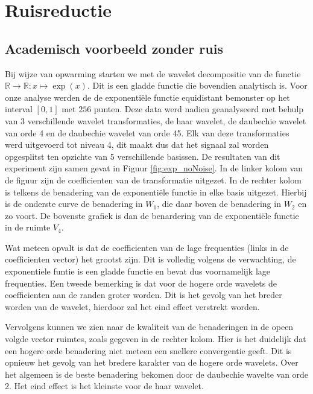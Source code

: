 \section{Ruisreductie}

\subsection{Academisch voorbeeld zonder ruis}

Bij wijze van opwarming starten we met de wavelet decompositie van de functie $ \mathbb{R}  \to \mathbb{R}: x \mapsto \exp(x)$. 
Dit is een gladde functie die bovendien analytisch is. 
Voor onze analyse werden de de exponenti\"ele functie equidistant bemonster op het interval $ [0,1] $ met $ 256 $ punten.
Deze data werd nadien geanalyseerd met behulp van 3 verschillende wavelet transformaties, de haar wavelet, de daubechie wavelet van orde 4 en de daubechie wavelet van orde 45.
Elk van deze transformaties werd uitgevoerd tot niveau 4, dit maakt dus dat het signaal zal worden opgesplitst ten opzichte van 5 verschillende basissen.  
De resultaten van dit experiment zijn samen gevat in Figuur \ref{fig:exp_noNoise}.
In de linker kolom van de figuur zijn de coefficienten van de transformatie uitgezet.
In de rechter kolom is telkens de benadering van de exponenti\"ele functie in elke basis uitgezet.
Hierbij is de onderste curve de benadering in $ W_1 $, die daar boven de benadering in $ W_2 $ en zo voort.
De bovenste grafiek is dan de benardering van de exponenti\"ele functie in de ruimte $ V_4 $.

Wat meteen opvalt is dat de coefficienten van de lage frequenties (links in de coefficienten vector) het grootst zijn.
Dit is volledig volgens de verwachting, de exponentiele funtie is een gladde functie en bevat dus voornamelijk lage frequenties.
Een tweede bemerking is dat voor de hogere orde wavelets de coefficienten aan de randen groter worden.
Dit is het gevolg van het breder worden van de wavelet, hierdoor zal het eind effect verstrekt worden.

Vervolgens kunnen we zien naar de kwaliteit van de benaderingen in de opeen volgde vector ruimtes, zoals gegeven in de rechter kolom.
Hier is het duidelijk dat een hogere orde benadering niet meteen een snellere convergentie geeft.
Dit is opnieuw het gevolg van het bredere karakter van de hogere orde wavelets.
Over het algemeen is de beste benadering bekomen door de daubechie wavelte van orde 2.
Het eind effect is het kleinste voor de haar wavelet.


